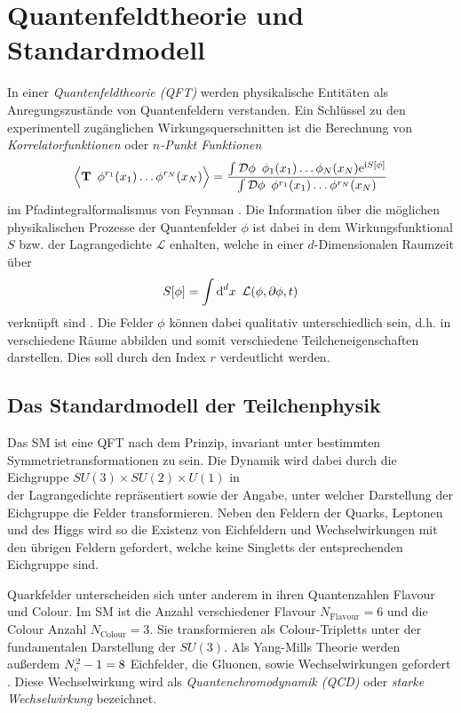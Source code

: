 \clearpage
\section{Quantenfeldtheorie und Standardmodell}
  In einer \textit{Quantenfeldtheorie (QFT)} werden physikalische Entitäten 
  als Anregungszustände von Quantenfeldern 
  verstanden. Ein Schlüssel zu den experimentell zugänglichen 
  Wirkungsquerschnitten ist die Berechnung von \textit{Korrelatorfunktionen} 
  oder \textit{$n$-Punkt Funktionen}
  \begin{equation}
   \Big\langle \textbf{T} \,\,\, \phi^{r_1}(x_1) \ldots \phi^{r_N}(x_N) 
   \Big\rangle
   =\frac{\int \mathcal{D}\phi \,\,\, \phi_1(x_1)\ldots \phi_N(x_N) 
   \text{e}^{\text{i} S[\phi]}}{\int \mathcal{D}\phi \,\,\, \phi^{r_1}(x_1) \ldots 
   \phi^{r_N}(x_N) }
   \label{renormierung:Korrelator_definition}
  \end{equation}
  im Pfadintegralformalismus von Feynman \cite{Schwartz}. Die Information über 
  die möglichen 
  physikalischen Prozesse der Quantenfelder $\phi$ 
  ist dabei in dem Wirkungsfunktional $S$ bzw. der Lagrangedichte $\mathcal{L}$ 
  enhalten, welche in einer $d$-Dimensionalen Raumzeit über 
  \begin{equation}
    S[\phi] = \int \text{d}^d x \,\,\, \mathcal{L}(\phi,\partial \phi, t) 
    \label{renormierung:Wirkung_definition}
  \end{equation}
  verknüpft sind \cite{Schwartz}. Die Felder $\phi$ können dabei qualitativ 
  unterschiedlich sein, d.h. in verschiedene Räume abbilden und somit 
  verschiedene Teilcheneigenschaften darstellen. Dies soll durch den Index 
  $r$ verdeutlicht werden.

  \subsection{Das Standardmodell der Teilchenphysik}
    Das SM ist eine QFT nach dem Prinzip, invariant unter bestimmten 
    Symmetrietransformationen zu sein. Die Dynamik wird dabei durch die 
    Eichgruppe $SU(3)\times SU(2)\times U(1)$ in \\der Lagrangedichte 
    repräsentiert sowie der Angabe, 
    unter welcher Darstellung der Eichgruppe die Felder transformieren. 
    Neben den Feldern der Quarks, Leptonen und des Higgs wird so die 
    Existenz von Eichfeldern und Wechselwirkungen mit den übrigen Feldern 
    gefordert, welche keine Singletts der entsprechenden Eichgruppe sind.

    Quarkfelder unterscheiden sich unter anderem in ihren Quantenzahlen 
    Flavour und Colour. Im SM ist die Anzahl verschiedener 
    Flavour $N_\text{Flavour}=6$ und die Colour Anzahl $N_\text{Colour} = 3$. 
    Sie transformieren als Colour-Tripletts unter der fundamentalen Darstellung 
    der $SU(3)$. Als Yang-Mills Theorie werden außerdem $N_\text{c}^2-1 = 8$ 
    Eichfelder, die Gluonen, sowie Wechselwirkungen gefordert \cite{Zinn}. 
    Diese Wechselwirkung wird  als \textit{Quantenchromodynamik (QCD)} oder 
    \textit{starke Wechselwirkung} bezeichnet.
    
